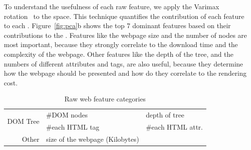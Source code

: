  To understand the usefulness of each raw feature, we apply the Varimax rotation~\cite{manly2016multivariate}
to the \PCA space. This technique quantifies the contribution of each feature to each \PC. Figure~\ref{fig:pca}b shows the top 7 dominant
features based on their contributions to the \PCs. Features like the webpage size and the number of \DOM nodes are most important,
because they strongly correlate to the download time and the complexity of the webpage. Other features like the depth of the \DOM tree, and
the numbers of different attributes and tags, are also useful, because they determine how the webpage should be presented
and how do they correlate to the rendering cost. 


\begin{table}[t!]
\caption{Raw web feature categories}
\vspace{-2mm}
\small
\centering
        \begin{tabular}{rll}
        \toprule
        \multirow{2}{*}{DOM Tree} & \#DOM nodes & depth of tree \\
                & \#each HTML tag & \#each HTML attr. \\
        \rowcolor[gray]{.92}Other  & size of the webpage (Kilobytes) & \\
        \bottomrule
        \end{tabular}
\label{tab:rawfeature}
\vspace{-2mm}
\end{table}









